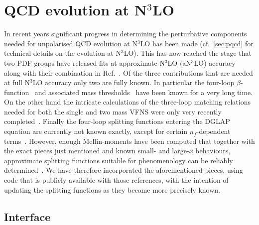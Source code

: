 
\section{QCD evolution at N$^3$LO}
\label{sec:n3lo-evolution}
In recent years significant progress in determining the perturbative
components needed for unpolarised QCD evolution at N$^3$LO has been
made (cf.\ \ref{sec:pqcd} for technical details on the evolution at
N$^3$LO).
%
This has now reached the stage that two PDF groups have released fits
at approximate N$^3$LO (aN$^3$LO)
accuracy~\cite{McGowan:2022nag,NNPDF:2024nan} along with their
combination in Ref.~\cite{Cridge:2024icl}.
%
Of the three contributions that are needed at full N$^3$LO accuracy
only two are fully known.
%
In particular the four-loop
$\beta$-function~\cite{vanRitbergen:1997va,Czakon:2004bu} and
associated mass thresholds~\cite{Chetyrkin:1997sg} have been known for
a very long time.
%
On the other hand the intricate calculations of the three-loop
matching relations needed for both the single and two mass VFNS were
only very recently
completed~\cite{Bierenbaum:2009mv,Ablinger:2010ty,Kawamura:2012cr,Blumlein:2012vq,ABLINGER2014263,Ablinger:2014nga,Ablinger:2014vwa,Behring:2014eya,Ablinger:2019etw,Behring:2021asx,Ablinger:2023ahe,Ablinger:2024xtt,Ablinger:2025awb}.
%
Finally the four-loop splitting functions entering the DGLAP equation
are currently not known exactly, except for certain $n_f$-dependent
terms~\cite{Gracey:1994nn,Davies:2016jie,Moch:2017uml,Gehrmann:2023cqm,Falcioni:2023tzp,Gehrmann:2023iah,Kniehl:2025ttz}.
%
However, enough Mellin-moments have been computed that together with
the exact pieces just mentioned and known small- and large-$x$
behaviours, approximate splitting functions suitable for phenomenology
can be reliably
determined~\cite{McGowan:2022nag,NNPDF:2024nan,Moch:2021qrk,Falcioni:2023luc,Falcioni:2023vqq,Moch:2023tdj,Falcioni:2024xyt,Falcioni:2024qpd}.
%
We have therefore incorporated the aforementioned pieces, using code
that is publicly available with those references, with the intention of
updating the splitting functions as they become more precisely known.

\subsection{Interface}

